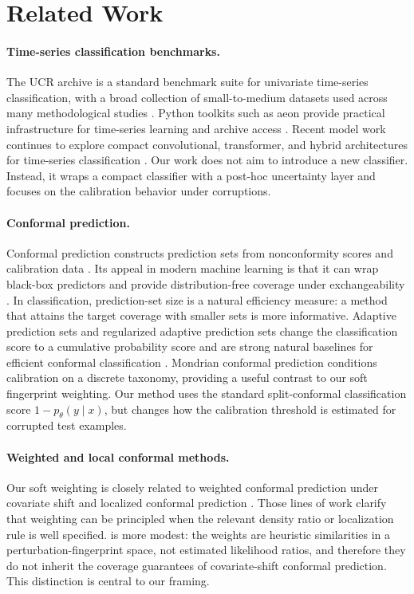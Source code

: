 \section{Related Work}

\paragraph{Time-series classification benchmarks.}
The UCR archive is a standard benchmark suite for univariate time-series classification, with a broad collection of small-to-medium datasets used across many methodological studies \citep{dau2019ucr}. Python toolkits such as aeon provide practical infrastructure for time-series learning and archive access \citep{middlehurst2024aeon}. Recent model work continues to explore compact convolutional, transformer, and hybrid architectures for time-series classification \citep{lan2024ctctime}. Our work does not aim to introduce a new classifier. Instead, it wraps a compact classifier with a post-hoc uncertainty layer and focuses on the calibration behavior under corruptions.

\paragraph{Conformal prediction.}
Conformal prediction constructs prediction sets from nonconformity scores and calibration data \citep{vovk2005algorithmic}. Its appeal in modern machine learning is that it can wrap black-box predictors and provide distribution-free coverage under exchangeability \citep{angelopoulos2021gentle}. In classification, prediction-set size is a natural efficiency measure: a method that attains the target coverage with smaller sets is more informative. Adaptive prediction sets and regularized adaptive prediction sets change the classification score to a cumulative probability score and are strong natural baselines for efficient conformal classification \citep{romano2020classification,angelopoulos2021uncertainty}. Mondrian conformal prediction conditions calibration on a discrete taxonomy, providing a useful contrast to our soft fingerprint weighting. Our method uses the standard split-conformal classification score $1-p_\theta(y\mid x)$, but changes how the calibration threshold is estimated for corrupted test examples.

\paragraph{Weighted and local conformal methods.}
Our soft weighting is closely related to weighted conformal prediction under covariate shift and localized conformal prediction \citep{tibshirani2019covariate,guan2023localized}. Those lines of work clarify that weighting can be principled when the relevant density ratio or localization rule is well specified. \fastcp{} is more modest: the weights are heuristic similarities in a perturbation-fingerprint space, not estimated likelihood ratios, and therefore they do not inherit the coverage guarantees of covariate-shift conformal prediction. This distinction is central to our framing.

